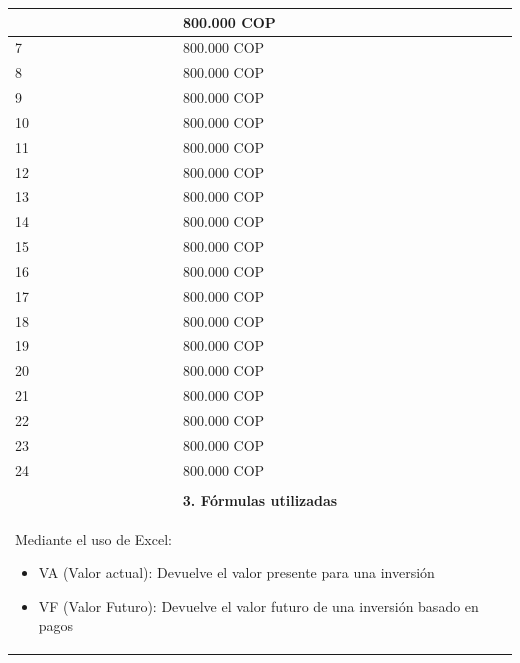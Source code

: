 \begin{center}
\begin{longtable}[H]{|p{0.333\linewidth}|p{0.3333\linewidth}|p{0.3333\linewidth}|}
{\begin{center}
\begin{tabular}{|p{4cm}|p{4cm}|}
    6                      &  800.000 COP    \\ \hline
    7                      &  800.000 COP    \\ \hline
    8                      &  800.000 COP    \\ \hline
    9                      &  800.000 COP    \\ \hline
    10                     &  800.000 COP    \\ \hline
    11                     &  800.000 COP    \\ \hline
    12                     &  800.000 COP    \\ \hline
    13                     &  800.000 COP    \\ \hline
    14                     &  800.000 COP    \\ \hline
    15                     &  800.000 COP    \\ \hline
    16                     &  800.000 COP    \\ \hline
    17                     &  800.000 COP    \\ \hline
    18                     &  800.000 COP    \\ \hline
    19                     &  800.000 COP    \\ \hline
    20                     &  800.000 COP    \\ \hline
    21                     &  800.000 COP    \\ \hline
    22                     &  800.000 COP    \\ \hline
    23                     &  800.000 COP    \\ \hline
    24                     &  800.000 COP    \\ \hline
   \end{tabular}
  \end{center}
  }                                                                                                                   \\ \hline
  \multicolumn{3}{|c|}{\cellcolor[HTML]{FFB183}\textbf{3. Fórmulas utilizadas}}                                       \\ \hline
  \multicolumn{3}{|p{\columnwidth}|}{Mediante el uso de Excel:
  \begin{itemize}
   \item VA (Valor actual): Devuelve el valor presente para una inversión
   \item VF (Valor Futuro): Devuelve el valor futuro de una inversión basado en pagos

\end{itemize}}
\end{longtable}
\end{center}
